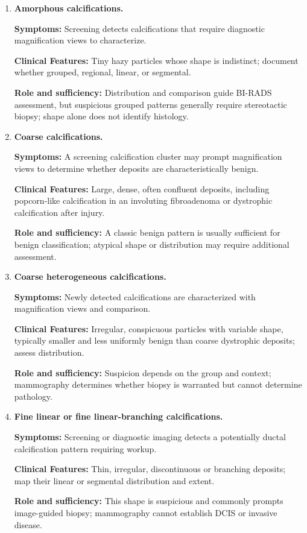 \begin{enumerate}[leftmargin=*,itemsep=0.45em,topsep=0.4em]
\item \textbf{Amorphous calcifications.}\par\noindent\textbf{Symptoms:} Screening detects calcifications that require diagnostic magnification views to characterize.\par\noindent\textbf{Clinical Features:} Tiny hazy particles whose shape is indistinct; document whether grouped, regional, linear, or segmental.\par\noindent\textbf{Role and sufficiency:} Distribution and comparison guide BI-RADS assessment, but suspicious grouped patterns generally require stereotactic biopsy; shape alone does not identify histology.
\item \textbf{Coarse calcifications.}\par\noindent\textbf{Symptoms:} A screening calcification cluster may prompt magnification views to determine whether deposits are characteristically benign.\par\noindent\textbf{Clinical Features:} Large, dense, often confluent deposits, including popcorn-like calcification in an involuting fibroadenoma or dystrophic calcification after injury.\par\noindent\textbf{Role and sufficiency:} A classic benign pattern is usually sufficient for benign classification; atypical shape or distribution may require additional assessment.
\item \textbf{Coarse heterogeneous calcifications.}\par\noindent\textbf{Symptoms:} Newly detected calcifications are characterized with magnification views and comparison.\par\noindent\textbf{Clinical Features:} Irregular, conspicuous particles with variable shape, typically smaller and less uniformly benign than coarse dystrophic deposits; assess distribution.\par\noindent\textbf{Role and sufficiency:} Suspicion depends on the group and context; mammography determines whether biopsy is warranted but cannot determine pathology.
\item \textbf{Fine linear or fine linear-branching calcifications.}\par\noindent\textbf{Symptoms:} Screening or diagnostic imaging detects a potentially ductal calcification pattern requiring workup.\par\noindent\textbf{Clinical Features:} Thin, irregular, discontinuous or branching deposits; map their linear or segmental distribution and extent.\par\noindent\textbf{Role and sufficiency:} This shape is suspicious and commonly prompts image-guided biopsy; mammography cannot establish DCIS or invasive disease.

\end{enumerate}
